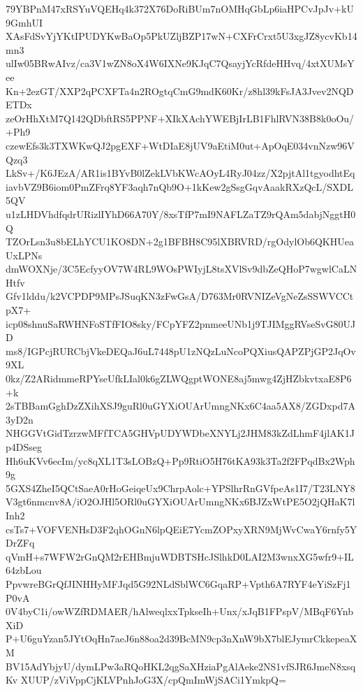 79YBPnM47xRSYuVQEHq4k372X76DoRiBUm7nOMHqGbLp6iaHPCvJpJv+kU9GmhUI
XAsFdSvYjYKtIPUDYKwBaOp5PkUZljBZP17wN+CXFrCrxt5U3xgJZ8ycvKb14mn3
ulIw05BRwAIvz/ca3V1wZN8oX4W6IXNe9KJqC7QsayjYcRfdeHHvq/4xtXUMsYee
Kn+2ezGT/XXP2qPCXFTa4n2ROgtqCmG9mdK60Kr/z8hl39kFsJA3Jvev2NQDETDx
zeOrHhXtM7Q142QDbftRS5PPNF+XIkXAchYWEBjIrLB1FhlRVN38B8k0oOu/+Ph9
czewEfs3k3TXWKwQJ2pgEXF+WtDIaE8jUV9aEtiM0ut+ApOqE034vnNzw96VQzq3
LkSv+/K6JEzA/AR1is1BYvB0lZekLVbKWcAOyL4RyJ04zz/X2pjtAl1tgyodhtEq
iavbVZ9B6iom0PmZFrq8YF3aqh7nQb9O+1kKew2gSsgGqvAaakRXzQcL/SXDL5QV
u1zLHDVhdfqdrURizlIYhD66A70Y/8xsTfP7mI9NAFLZaTZ9rQAm5dabjNggtH0Q
TZOrLsn3u8bELhYCU1KO8DN+2g1BFBH8C95lXBRVRD/rgOdylOb6QKHUeaUxLPNs
dmWOXNje/3C5EcfyyOV7W4RL9WOsPWIyjL8tsXVlSv9dbZeQHoP7wgwlCaLNHtfv
Gfv1lddu/k2VCPDP9MPsJSuqKN3zFwGsA/D763Mr0RVNIZeVgNeZsSSWVCCtpX7+
icp08shnuSaRWHNFoSTfFIO8sky/FCpYFZ2pnmeeUNb1j9TJIMggRVseSvG80UJD
ms8/IGPcjRURCbjVkeDEQaJ6uL7448pU1zNQzLuNcoPQXiusQAPZPjGP2JqOv9XL
0kz/Z2ARidmmeRPYseUfkLIal0k6gZLWQgptWONE8aj5mwg4ZjHZbkvtxaE8P6+k
2sTBBamGghDzZXihXSJ9guRl0uGYXiOUArUmngNKx6C4aa5AX8/ZGDxpd7A3yD2n
NHGGVtGidTzrzwMFfTCA5GHVpUDYWDbeXNYLj2JHM83kZdLhmF4jlAK1Jp4DSseg
Hh6uKVv6ecIm/yc8qXL1T3sLOBzQ+Pp9RtiO5H76tKA93k3Ta2f2FPqdBx2Wph9g
5GXS4ZheI5QCtSaeA0rHoGeiqeUx9ChrpAolc+YPSlhrRnGVfpeAs1I7/T23LNY8
V3gt6nmcnv8A/iO2OJHl5ORl0uGYXiOUArUmngNKx6BJZxWtPE5O2jQHaK7lInh2
csTs7+VOFVENHsD3F2qhOGnN6lpQEiE7YcmZOPxyXRN9MjWvCwaY6rnfy5YDrZFq
qVmH+s7WFW2rGnQM2rEHBmjuWDBTSHcJSlhkD0LAI2M3wnxXG5wfr9+IL64zbLou
PpvwreBGrQfJINHHyMFJqd5G92NLdSblWC6GqaRP+Vpth6A7RYF4eYiSzFj1P0vA
0V4byC1i/owWZfRDMAER/hAlweqlxxTpkseIh+Unx/xJqB1FPspV/MBqF6YnbXiD
P+U6guYzan5JYtOqHn7aeJ6n88oa2d39BcMN9cp3nXnW9bX7blEJymrCkkepeaXM
BV15AdYbjyU/dymLPw3aRQoHKL2qgSaXHziaPgAlAeke2NS1vfSJR6JmeN8xsqKv
XUUP/zViVppCjKLVPnhJoG3X/cpQmImWjSACi1YmkpQ=
